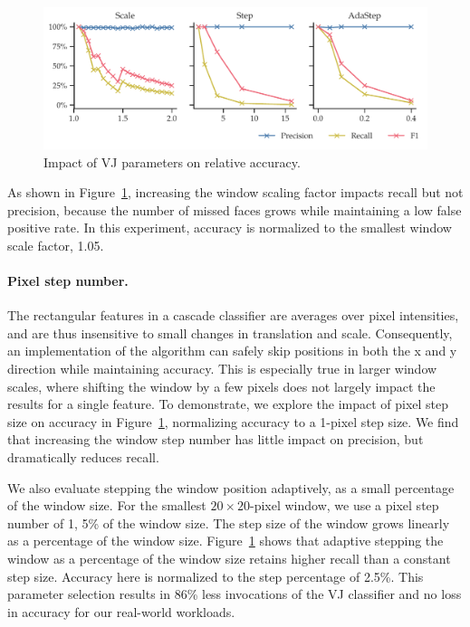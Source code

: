 \begin{figure}
\noindent
      \includegraphics[width=.8\textwidth,right]{nsp-figs/vj_algo_accuracy2.pdf}
    \caption{Impact of VJ parameters on relative accuracy.}
    \label{fig:vj-accuracy}

\end{figure}

As shown in Figure~\ref{fig:vj-accuracy}, increasing the window scaling factor impacts recall but not precision,
because the number of missed faces grows while maintaining a low false positive rate. In this experiment, accuracy is normalized to the smallest window scale factor, 1.05.

\paragraph{Pixel step number.}
The rectangular features in a cascade classifier are averages over pixel intensities,
and are thus insensitive to small changes in translation and scale. Consequently,
an implementation of the algorithm can safely skip positions in both the x and y direction while
maintaining accuracy. This is especially true in larger window scales, where shifting the window
by a few pixels does not largely impact the results for a single feature.
To demonstrate, we explore the impact of pixel step size on accuracy in Figure~\ref{fig:vj-accuracy}, normalizing
accuracy to a 1-pixel step size.  We find that increasing the window step number has little
impact on precision, but dramatically reduces recall.

We also evaluate stepping the window
position adaptively, as a small percentage of the window size. For the smallest $20\times 20$-pixel window, we use a
pixel step number of 1, 5\% of the window size. The step size of the window grows linearly as a
percentage of the window size. Figure~\ref{fig:vj-accuracy} shows that adaptive stepping the window as a percentage of the window size retains
higher recall than a constant step size. Accuracy here is normalized to the step percentage
of 2.5\%.
This parameter selection results in 86\% less invocations of the VJ classifier and no loss in accuracy for our real-world workloads.

